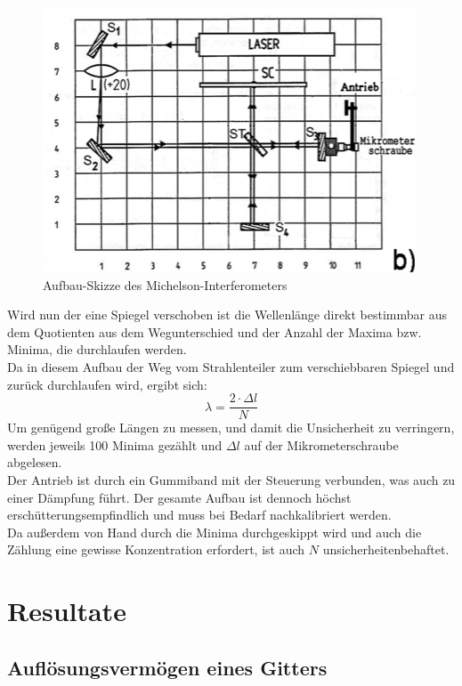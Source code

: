 \documentclass[12pt,a4paper]{article}
\begin{document}
\begin{multicols}{2}
\begin{figure}[H]
	\centering
	\includegraphics[scale=1.1]{./data/Interferometer/Interferometer_skizze.png}
	\caption{Aufbau-Skizze des Michelson-Interferometers}
	\label{fig:Skizze_Michelson}
\end{figure}

Wird nun der eine Spiegel verschoben ist die Wellenlänge direkt bestimmbar aus dem Quotienten aus dem Wegunterschied und der Anzahl der Maxima bzw. Minima, die durchlaufen werden.\\
Da in diesem Aufbau der Weg vom Strahlenteiler zum verschiebbaren Spiegel und zurück durchlaufen wird, ergibt sich:
$$\lambda = \frac{2\cdot \Delta l}{N}$$
Um genügend große Längen zu messen, und damit die Unsicherheit zu verringern, werden jeweils 100 Minima gezählt und $\Delta l$ auf der Mikrometerschraube abgelesen.\\
Der Antrieb ist durch ein Gummiband mit der Steuerung verbunden, was auch zu einer Dämpfung führt. Der gesamte Aufbau ist dennoch höchst erschütterungsempfindlich und muss bei Bedarf nachkalibriert werden.\\
Da außerdem von Hand durch die Minima durchgeskippt wird und auch die Zählung eine gewisse Konzentration erfordert, ist auch $N$ unsicherheitenbehaftet.



\section{Resultate}
\subsection{Auflösungsvermögen eines Gitters}



\end{multicols}
\end{document}
